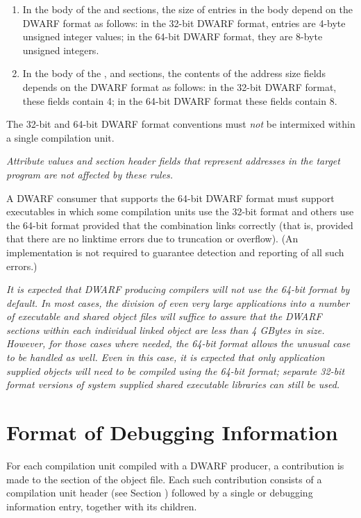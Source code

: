 \begin{enumerate}[1. ]
\item In the body of the \dotdebugstroffsets{} and \dotdebugstroffsetsdwo{}
sections, the size of entries in the body depend on the DWARF
format as follows: in the 32-bit DWARF format, entries are 4-byte
unsigned integer values; in the 64-bit DWARF format, they are
8-byte unsigned integers.

\item In the body of the \dotdebugaddr{}, \dotdebugloc{} and \dotdebugranges{}
sections, the contents of the address size fields depends on the
DWARF format as follows: in the 32-bit DWARF format, these fields
contain 4; in the 64-bit DWARF format these fields contain 8.
\end{enumerate}


The 32-bit and 64-bit DWARF format conventions must \emph{not} be
intermixed within a single compilation unit.

\textit{Attribute values and section header fields that represent
addresses in the target program are not affected by these
rules.}

A DWARF consumer that supports the 64-bit DWARF format must
support executables in which some compilation units use the
32-bit format and others use the 64-bit format provided that
the combination links correctly (that is, provided that there
are no link\dash time errors due to truncation or overflow). (An
implementation is not required to guarantee detection and
reporting of all such errors.)

\textit{It is expected that DWARF producing compilers will \emph{not} use
the 64-bit format \emph{by default}. In most cases, the division of
even very large applications into a number of executable and
shared object files will suffice to assure that the DWARF sections
within each individual linked object are less than 4 GBytes
in size. However, for those cases where needed, the 64-bit
format allows the unusual case to be handled as well. Even
in this case, it is expected that only application supplied
objects will need to be compiled using the 64-bit format;
separate 32-bit format versions of system supplied shared
executable libraries can still be used.}



\section{Format of Debugging Information}
\label{datarep:formatofdebugginginformation}

For each compilation unit compiled with a DWARF producer,
a contribution is made to the \dotdebuginfo{} section of
the object file. Each such contribution consists of a
compilation unit header 
(see Section ) 
followed by a
single \DWTAGcompileunit{} or 
\DWTAGpartialunit{} debugging
information entry, together with its children.

